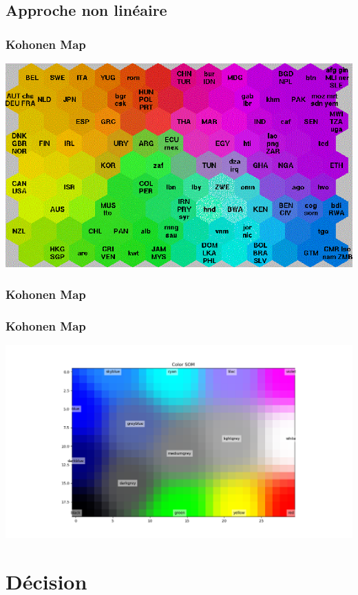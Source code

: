 \documentclass[11pt]{beamer}
\newenvironment{slide}[1]{%
\begin{frame}[environment=slide]
\frametitle{#1}
}{%
\end{frame}
}
\newcommand{\Pythonsmall}[1]{
	{\scriptsize }
}
\begin{document}
\subsection{Approche non linéaire}

\begin{slide}{Kohonen Map}
\begin{center}
\includegraphics[scale=0.35]{povertymap}
\end{center}
\end{slide}

\begin{slide}{Kohonen Map}
\Pythonsmall{som1-extract}
\end{slide}

\begin{slide}{Kohonen Map}
\begin{center}
\includegraphics[scale=0.35]{som_exemple1}
\end{center}
\end{slide}

\section{Décision}
\end{document}
